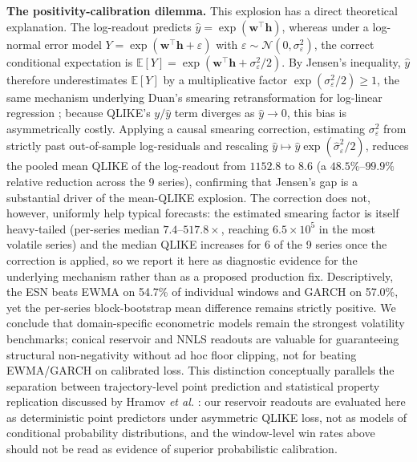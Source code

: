 \documentclass[aip,cha,reprint,amsmath,amssymb]{revtex4-2}
\begin{document}
\textbf{The positivity-calibration dilemma.} This explosion has a direct theoretical explanation. The log-readout predicts $\hat{y} = \exp(\mathbf{w}^\top\mathbf{h})$, whereas under a log-normal error model $Y = \exp(\mathbf{w}^\top\mathbf{h} + \varepsilon)$ with $\varepsilon \sim \mathcal{N}(0,\sigma_\varepsilon^2)$, the correct conditional expectation is $\mathbb{E}[Y] = \exp(\mathbf{w}^\top\mathbf{h} + \sigma_\varepsilon^2/2)$. By Jensen's inequality, $\hat{y}$ therefore underestimates $\mathbb{E}[Y]$ by a multiplicative factor $\exp(\sigma_\varepsilon^2/2) \ge 1$, the same mechanism underlying Duan's smearing retransformation for log-linear regression \cite{duan1983smearing}; because QLIKE's $y/\hat{y}$ term diverges as $\hat{y}\to 0$, this bias is asymmetrically costly. Applying a causal smearing correction, estimating $\sigma_\varepsilon^2$ from strictly past out-of-sample log-residuals and rescaling $\hat{y} \mapsto \hat{y}\exp(\hat\sigma_\varepsilon^2/2)$, reduces the pooled mean QLIKE of the log-readout from $1152.8$ to $8.6$ (a $48.5\%$--$99.9\%$ relative reduction across the 9 series), confirming that Jensen's gap is a substantial driver of the mean-QLIKE explosion. The correction does not, however, uniformly help typical forecasts: the estimated smearing factor is itself heavy-tailed (per-series median $7.4$--$517.8\times$, reaching $6.5\times10^5$ in the most volatile series) and the median QLIKE increases for 6 of the 9 series once the correction is applied, so we report it here as diagnostic evidence for the underlying mechanism rather than as a proposed production fix. Descriptively, the ESN beats EWMA on 54.7\% of individual windows and GARCH on 57.0\%, yet the per-series block-bootstrap mean difference remains strictly positive. We conclude that domain-specific econometric models remain the strongest volatility benchmarks; conical reservoir and NNLS readouts are valuable for guaranteeing structural non-negativity without ad hoc floor clipping, not for beating EWMA/GARCH on calibrated loss. This distinction conceptually parallels the separation between trajectory-level point prediction and statistical property replication discussed by Hramov \emph{et al.} \cite{hramov2025strong}: our reservoir readouts are evaluated here as deterministic point predictors under asymmetric QLIKE loss, not as models of conditional probability distributions, and the window-level win rates above should not be read as evidence of superior probabilistic calibration.

\end{document}
